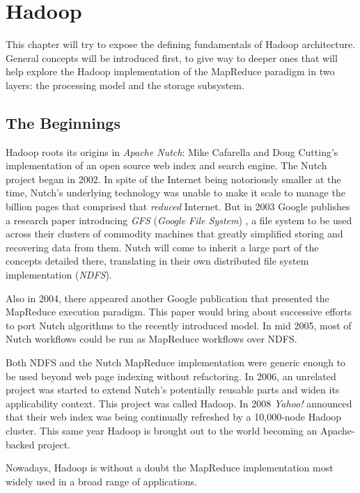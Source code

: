\chapter{Hadoop}\label{cap:hadoop}
\noindent This chapter will try to expose the defining fundamentals of Hadoop architecture. General concepts will be introduced first, to give way to deeper ones that will help explore the Hadoop implementation of the MapReduce paradigm in two layers: the processing model and the storage subsystem.

\section{The Beginnings}\label{sec:origen}
\noindent Hadoop roots its origins in \emph{Apache Nutch}: Mike Cafarella and Doug Cutting's implementation of an open source web index and search engine. The Nutch project began in 2002. In spite of the Internet being notoriously smaller at the time, Nutch's underlying technology was unable to make it scale to manage the billion pages that comprised that \emph{reduced} Internet. But in 2003 Google publishes a research paper introducing \emph{GFS} (\emph{Google File System}) \cite{gfs}, a file system to be used across their clusters of commodity machines that greatly simplified storing and recovering data from them. Nutch will come to inherit a large part of the concepts detailed there, translating in their own distributed file system implementation (\emph{NDFS}).

Also in 2004, there appeared another Google publication \cite{googlemapreduce} that presented the MapReduce execution paradigm. This paper would bring about successive efforts to port Nutch algorithms to the recently introduced model. In mid 2005, most of Nutch workflows could be run as MapReduce workflows over NDFS.

Both NDFS and the Nutch MapReduce implementation were generic enough to be used beyond web page indexing without refactoring. In 2006, an unrelated project was started to extend Nutch's potentially reusable parts and widen its applicability context. This project was called Hadoop. In 2008 \emph{Yahoo!} announced that their web index was being continually refreshed by a 10,000-node Hadoop cluster. This same year Hadoop is brought out to the world becoming an Apache-backed project.

Nowadays, Hadoop is without a doubt the MapReduce implementation most widely used in a broad range of applications.

